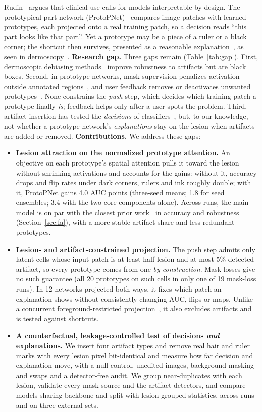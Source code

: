 \documentclass[conference]{IEEEtran}
\begin{document}
Rudin~\cite{rudin2019} argues that clinical use calls for models interpretable by design. The prototypical part network (ProtoPNet)~\cite{chen2019} compares image patches with learned prototypes, each projected onto a real training patch, so a decision reads ``this part looks like that part''. Yet a prototype may be a piece of a ruler or a black corner; the shortcut then survives, presented as a reasonable explanation~\cite{hoffmann2021}, as seen in dermoscopy~\cite{correia2023,nauta2023pip}. \textbf{Research gap.} Three gaps remain (Table~\ref{tab:gap}). First, dermoscopic debiasing methods~\cite{bevan2022,yan2023,pahde2023} improve robustness to artifacts but are black boxes. Second, in prototype networks, mask supervision penalizes activation outside annotated regions~\cite{barnett2021,correia2023}, and user feedback removes or deactivates unwanted prototypes~\cite{bontempelli2023,nauta2023pip}. None constrains the \emph{push} step, which decides which training patch a prototype finally \emph{is}; feedback helps only after a user spots the problem. Third, artifact insertion has tested the \emph{decisions} of classifiers~\cite{nauta2022,nauta2023pip,pahde2023}, but, to our knowledge, not whether a prototype network's \emph{explanations} stay on the lesion when artifacts are added or removed. \textbf{Contributions.} We address these gaps:
\begin{itemize}
\item \textbf{Lesion attraction on the normalized prototype attention.} An objective on each prototype's spatial attention pulls it toward the lesion without shrinking activations and accounts for the gains: without it, accuracy drops and flip rates under dark corners, rulers and ink roughly double; with it, ProtoPNet gains 4.0 AUC points (three-seed means; 1.8 for seed ensembles; 3.4 with the two core components alone). Across runs, the main model is on par with the closest prior work~\cite{correia2023} in accuracy and robustness (Section~\ref{sec:fa}), with a more stable artifact share and less redundant prototypes.
\item \textbf{Lesion- and artifact-constrained projection.} The push step admits only latent cells whose input patch is at least half lesion and at most 5\% detected artifact, so every prototype comes from one \emph{by construction}. Mask losses give no such guarantee (all 20 prototypes on such cells in only one of 19 mask-loss runs). In 12 networks projected both ways, it fixes which patch an explanation shows without consistently changing AUC, flips or maps. Unlike a concurrent foreground-restricted projection~\cite{lin2026}, it also excludes artifacts and is tested against shortcuts.
\item \textbf{A counterfactual, leakage-controlled test of decisions \emph{and} explanations.} We insert four artifact types and remove real hair and ruler marks with every lesion pixel bit-identical and measure how far decision and explanation move, with a null control, unedited images, background masking and swaps and a detector-free audit. We group near-duplicates with each lesion, validate every mask source and the artifact detectors, and compare models sharing backbone and split with lesion-grouped statistics, across runs and on three external sets.
\end{itemize}
\end{document}
